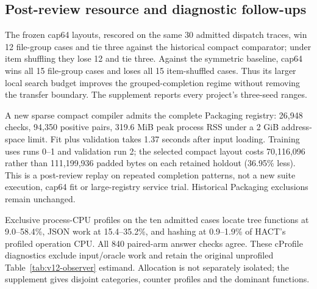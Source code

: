 \subsection{Post-review resource and diagnostic follow-ups}
The frozen cap64 layouts, rescored on the same 30 admitted dispatch traces,
win 12 file-group cases and tie three against the historical compact
comparator; under item shuffling they lose 12 and tie three.
Against the symmetric baseline, cap64 wins all 15 file-group cases and
loses all 15 item-shuffled cases. Thus its larger local search budget
improves the grouped-completion regime without removing the transfer
boundary. The supplement reports every project's three-seed ranges.

A new sparse compact compiler admits the complete Packaging registry: 26,948 checks, 94,350 positive pairs, 319.6 MiB peak process RSS under a 2 GiB address-space limit. Fit plus validation takes 1.37 seconds after input loading. Training uses runs 0--1 and validation run 2; the selected compact layout costs 70,116,096 rather than 111,199,936 padded bytes on each retained holdout (36.95\% less). This is a post-review replay on repeated completion patterns, not a new suite execution, cap64 fit or large-registry service trial. Historical Packaging exclusions remain unchanged.

Exclusive process-CPU profiles on the ten admitted cases locate tree
functions at 9.0--58.4\%, JSON work at 15.4--35.2\%, and hashing at
0.9--1.9\% of HACT's profiled operation CPU. All 840 paired-arm answer
checks agree. These cProfile diagnostics exclude input/oracle work and
retain the original unprofiled Table~\ref{tab:v12-observer} estimand.
Allocation is not separately isolated; the supplement gives disjoint
categories, counter profiles and the dominant functions.
